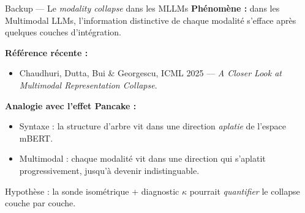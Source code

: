 \documentclass[aspectratio=169,11pt]{beamer}
\begin{document}
\begin{frame}{Backup --- Le \emph{modality collapse} dans les MLLMs}
  \textbf{Phénomène :} dans les Multimodal LLMs, l'information
  distinctive de chaque modalité \alert{s'efface} après quelques
  couches d'intégration.

  \medskip
  \textbf{Référence récente :}
  \begin{itemize}\setlength\itemsep{2pt}
    \item Chaudhuri, Dutta, Bui \& Georgescu, ICML 2025 ---
          \emph{A Closer Look at Multimodal Representation Collapse}.
  \end{itemize}

  \vspace{0.4cm}
  \textbf{Analogie avec l'effet Pancake :}
  \begin{itemize}\setlength\itemsep{2pt}
    \item Syntaxe : la structure d'arbre vit dans une direction
          \emph{aplatie} de l'espace mBERT.
    \item Multimodal : chaque modalité vit dans une direction qui
          s'aplatit progressivement, jusqu'à devenir indistinguable.
  \end{itemize}

  \vspace{0.3cm}
  \alert{Hypothèse :} la sonde isométrique + diagnostic $\kappa$
  pourrait \emph{quantifier} le collapse couche par couche.
\end{frame}
\end{document}
